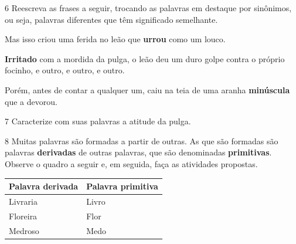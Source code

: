 
\num{6} Reescreva as frases a seguir, trocando as palavras em destaque por
sinônimos, ou seja, palavras diferentes que têm significado
semelhante.


\begin{escolha}[itemsep=-5pt]
\item Mas isso criou uma ferida no leão que \textbf{urrou} como um louco.

\item \textbf{Irritado} com a mordida da pulga, o leão deu um duro golpe contra o próprio focinho, e outro, e outro, e outro.

\item Porém, antes de contar a qualquer um, caiu na teia de uma aranha \textbf{minúscula} que a devorou.
\end{escolha}

\num{7} Caracterize com suas palavras a atitude da pulga.

\num{8} Muitas palavras são formadas a partir de outras. As que são formadas são
palavras \textbf{derivadas} de outras palavras, que são denominadas
\textbf{primitivas}. Observe o quadro a seguir e, em seguida, faça as
atividades propostas.

\begin{center}
\begin{tabular}{ll}
\hline
\textbf{Palavra derivada} & \textbf{Palavra primitiva} \\ \hline
Livraria & Livro \\
Floreira & Flor \\
Medroso & Medo \\ \hline
\end{tabular}
\end{center}

